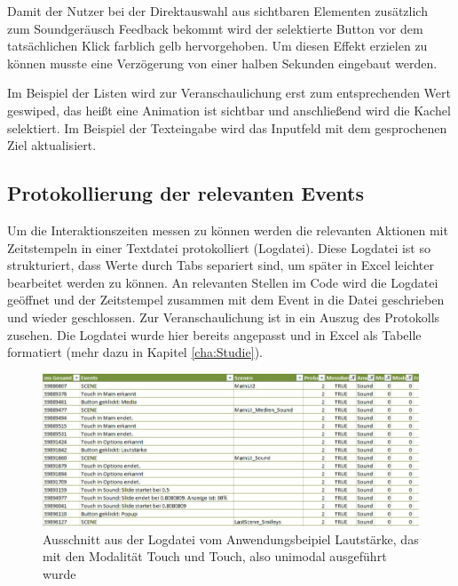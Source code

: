 Damit der Nutzer bei der Direktauswahl aus sichtbaren Elementen zusätzlich zum Soundgeräusch Feedback bekommt wird der selektierte Button vor dem tatsächlichen Klick farblich gelb hervorgehoben. 
Um diesen Effekt erzielen zu können musste eine Verzögerung von einer halben Sekunden eingebaut werden.

Im Beispiel der Listen wird zur Veranschaulichung erst zum entsprechenden Wert geswiped, das heißt eine Animation ist sichtbar und anschließend wird die Kachel selektiert. 
Im Beispiel der Texteingabe wird das Inputfeld mit dem gesprochenen Ziel aktualisiert.

\subsection[Protokollierung]{Protokollierung der relevanten Events}
Um die Interaktionszeiten messen zu können werden die relevanten Aktionen mit Zeitstempeln in einer Textdatei protokolliert (Logdatei). 
Diese Logdatei ist so strukturiert, dass Werte durch Tabs separiert sind, um später in Excel leichter bearbeitet werden zu können.
An relevanten Stellen im Code wird die Logdatei geöffnet und der Zeitstempel zusammen mit dem Event in die Datei geschrieben und wieder geschlossen. 
Zur Veranschaulichung ist in  ein Auszug des Protokolls zusehen. 
Die Logdatei wurde hier bereits angepasst und in Excel als Tabelle formatiert (mehr dazu in Kapitel \ref{cha:Studie}). 
\begin{figure}
	\centering
		\includegraphics[width=1\textwidth]{img/Auszug_Logging_Sound_TT.JPG}
	\caption[Ausschnitt aus der Logdatei vom Anwendungsbeipiel Lautstärke]{Ausschnitt aus der Logdatei vom Anwendungsbeipiel Lautstärke, das mit den Modalität Touch und Touch, also unimodal ausgeführt wurde}
	\label{fig:Auszug_Logging_Sound_TT}
\end{figure}

